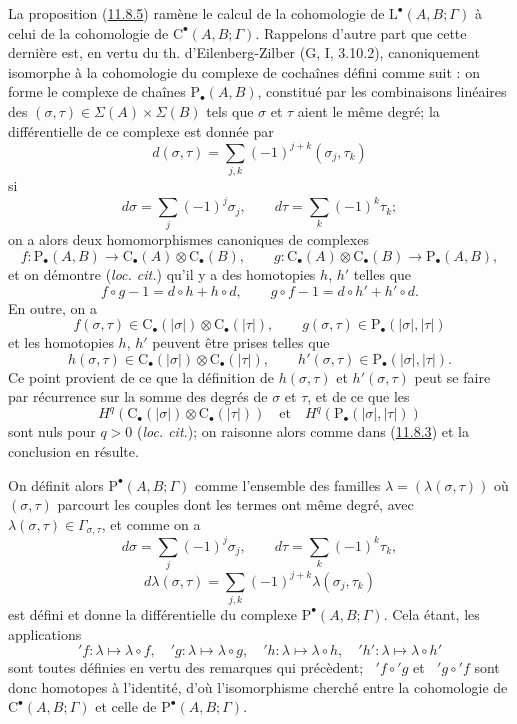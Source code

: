 \begin{env}[11.8.6]
\label{0.11.8.6-fr}
La proposition (\hyperref[0.11.8.5-fr]{11.8.5}) ramène le calcul de la
cohomologie de $\mathrm L^\bullet(A,B;\Gamma)$ à celui de la cohomologie de
$\mathrm C^\bullet(A,B;\Gamma)$. Rappelons d'autre part que cette dernière
est, en vertu du th. d'Eilenberg-Zilber (G, I, 3.10.2), canoniquement
isomorphe à la cohomologie du complexe de cochaînes défini comme suit : on
forme le complexe de chaînes $\mathrm P_\bullet(A,B)$, constitué par les
combinaisons linéaires des $(\sigma,\tau)\in\Sigma(A)\times\Sigma(B)$ tels
que $\sigma$ et $\tau$ aient le même degré; la différentielle de ce complexe
est donnée par
\[
d(\sigma,\tau)=\sum_{j,k}(-1)^{j+k}(\sigma_j,\tau_k)
\]
si
\[
d\sigma=\sum_j(-1)^j\sigma_j,\qquad
d\tau=\sum_k(-1)^k\tau_k;
\]
on a alors deux homomorphismes canoniques de complexes
\[
f:\mathrm P_\bullet(A,B)\longrightarrow
\mathrm C_\bullet(A)\otimes\mathrm C_\bullet(B),\qquad
g:\mathrm C_\bullet(A)\otimes\mathrm C_\bullet(B)
\longrightarrow\mathrm P_\bullet(A,B),
\]
et on démontre (\emph{loc. cit.}) qu'il y a des homotopies $h$, $h'$ telles
que
\[
f\circ g-1=d\circ h+h\circ d,\qquad
g\circ f-1=d\circ h'+h'\circ d.
\]
En outre, on a
\[
f(\sigma,\tau)\in\mathrm C_\bullet(|\sigma|)
\otimes\mathrm C_\bullet(|\tau|),\qquad
g(\sigma,\tau)\in\mathrm P_\bullet(|\sigma|,|\tau|)
\]
et les homotopies $h$, $h'$ peuvent être prises telles que
\[
h(\sigma,\tau)\in\mathrm C_\bullet(|\sigma|)
\otimes\mathrm C_\bullet(|\tau|),\qquad
h'(\sigma,\tau)\in\mathrm P_\bullet(|\sigma|,|\tau|).
\]
Ce point provient de ce que la définition de $h(\sigma,\tau)$ et
$h'(\sigma,\tau)$ peut se faire par récurrence sur la somme des degrés de
$\sigma$ et $\tau$, et de ce que les
\[
H^q(\mathrm C_\bullet(|\sigma|)\otimes\mathrm C_\bullet(|\tau|))
\quad\text{et}\quad
H^q(\mathrm P_\bullet(|\sigma|,|\tau|))
\]
sont nuls pour $q>0$ (\emph{loc. cit.}); on raisonne alors comme dans
(\hyperref[0.11.8.3-fr]{11.8.3}) et la conclusion en résulte.

On définit alors $\mathrm P^\bullet(A,B;\Gamma)$ comme l'ensemble des
familles $\lambda=(\lambda(\sigma,\tau))$ où $(\sigma,\tau)$ parcourt les
couples dont les termes ont même degré, avec
$\lambda(\sigma,\tau)\in\Gamma_{\sigma,\tau}$, et comme on a
\[
d\sigma=\sum_j(-1)^j\sigma_j,\qquad
d\tau=\sum_k(-1)^k\tau_k,
\]
\[
d\lambda(\sigma,\tau)=
\sum_{j,k}(-1)^{j+k}\lambda(\sigma_j,\tau_k)
\]
est défini et donne la différentielle du complexe
$\mathrm P^\bullet(A,B;\Gamma)$. Cela étant, les applications
\[
{}'f:\lambda\mapsto\lambda\circ f,\quad
{}'g:\lambda\mapsto\lambda\circ g,\quad
{}'h:\lambda\mapsto\lambda\circ h,\quad
{}'h':\lambda\mapsto\lambda\circ h'
\]
sont toutes définies en vertu des remarques qui précèdent;
$\mathop{}'f\circ{}'g$ et $\mathop{}'g\circ{}'f$ sont donc homotopes à
l'identité, d'où l'isomorphisme cherché entre la cohomologie de
$\mathrm C^\bullet(A,B;\Gamma)$ et celle de
$\mathrm P^\bullet(A,B;\Gamma)$.
\end{env}

